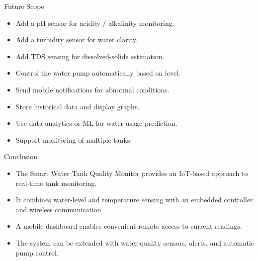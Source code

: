 \documentclass[aspectratio=169]{beamer}
\begin{document}
\begin{frame}{Future Scope}

\begin{itemize}

    \item Add a pH sensor for acidity / alkalinity monitoring.

    \item Add a turbidity sensor for water clarity.

    \item Add TDS sensing for dissolved-solids estimation.

    \item Control the water pump automatically based on level.

    \item Send mobile notifications for abnormal conditions.

    \item Store historical data and display graphs.

    \item Use data analytics or ML for water-usage prediction.

    \item Support monitoring of multiple tanks.

\end{itemize}

\end{frame}


\begin{frame}{Conclusion}

\begin{itemize}

    \item The Smart Water Tank Quality Monitor provides an
    IoT-based approach to real-time tank monitoring.

    \item It combines water-level and temperature sensing with
    an embedded controller and wireless communication.

    \item A mobile dashboard enables convenient remote access
    to current readings.

    \item The system can be extended with water-quality sensors,
    alerts, and automatic pump control.

\end{itemize}

\end{frame}
\end{document}
